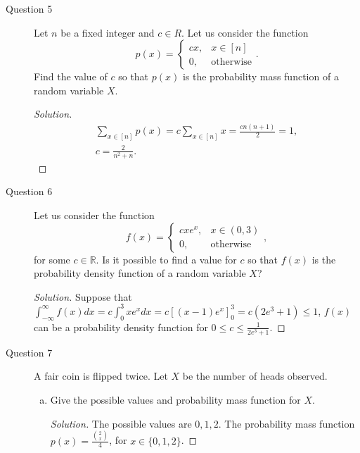 \documentclass[addpoints, 11pt]{exam}
\newcommand*{\R}{\mathbb{R}}
\begin{document}
\begin{description}
    \newpage

    \item[Question 5]  Let $n$ be a fixed integer and $c \in R$. Let us consider the function
    \[
        p(x) = \begin{cases}
            cx, & x \in [n] \\
            0, & \text{otherwise}
        \end{cases}.
    \]
    Find the value of $c$ so that $p(x)$ is the probability mass function of a random variable $X$. 

    \begin{proof}[Solution]
    \begin{gather}
        \sum_{x \in [n]} p(x) = c\sum_{x \in [n]} x = \frac{cn(n+1)}{2} = 1, \\
        c = \frac{2}{n^2 + n}.
    \end{gather}
    \end{proof}

    \newpage

    \item[Question 6]  Let us consider the function
    \[
        f(x) = \begin{cases}
            cxe^x, & x \in (0,3) \\
            0, & \text{otherwise}
        \end{cases},
    \]
    for some $c \in \R$. Is it possible to find a value for $c$ so that $f(x)$ is the probability density function of a random variable $X$?

    \begin{proof}[Solution]
    Suppose that $\int^{\infty}_{-\infty} f(x) dx = c\int^3_0 xe^x dx = c[(x-1)e^x]^3_0 = c(2e^3 + 1) \leq 1$, $f(x)$ can be a probability density function for $0 \leq c \leq \frac{1}{2e^3 + 1}$.
    \end{proof}

    \newpage

    \item[Question 7]  A fair coin is flipped twice. Let $X$ be the number of heads observed.

    \begin{enumerate}[(a)]
        \item Give the possible values and probability mass function for $X$.

        \begin{proof}[Solution]
            The possible values are $0,1,2$. The probability mass function $p(x) = \frac{{2 \choose x}}{4}$, for $x \in \{0, 1, 2\}$.
        \end{proof}


\end{enumerate}
\end{description}
\end{document}
